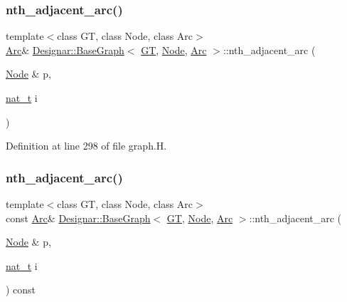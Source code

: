 \subsubsection{\texorpdfstring{nth\+\_\+adjacent\+\_\+arc()}{nth\_adjacent\_arc()}\hspace{0.1cm}{\footnotesize\ttfamily [1/2]}}
{\footnotesize\ttfamily template$<$class GT, class Node, class Arc$>$ \\
\hyperlink{namespace_designar_a3f55fb5513d62ff47cbc8f72b8e95d6f}{Arc}\& \hyperlink{class_designar_1_1_base_graph}{Designar\+::\+Base\+Graph}$<$ \hyperlink{demo-buildgraph_8_c_a3001c40d2c31ca87ed96cd7d1334a55e}{GT}, \hyperlink{namespace_designar_a5af326c65aa2bd26b26c410f2030d09e}{Node}, \hyperlink{namespace_designar_a3f55fb5513d62ff47cbc8f72b8e95d6f}{Arc} $>$\+::nth\+\_\+adjacent\+\_\+arc (\begin{DoxyParamCaption}\item[{\hyperlink{namespace_designar_a5af326c65aa2bd26b26c410f2030d09e}{Node} \&}]{p,  }\item[{\hyperlink{namespace_designar_aa72662848b9f4815e7bf31a7cf3e33d1}{nat\+\_\+t}}]{i }\end{DoxyParamCaption})\hspace{0.3cm}{\ttfamily [inline]}}



Definition at line 298 of file graph.\+H.

\mbox{\label{class_designar_1_1_base_graph_a3ca561f708fec1724d5c95192f98ef96}} 
\subsubsection{\texorpdfstring{nth\+\_\+adjacent\+\_\+arc()}{nth\_adjacent\_arc()}\hspace{0.1cm}{\footnotesize\ttfamily [2/2]}}
{\footnotesize\ttfamily template$<$class GT, class Node, class Arc$>$ \\
const \hyperlink{namespace_designar_a3f55fb5513d62ff47cbc8f72b8e95d6f}{Arc}\& \hyperlink{class_designar_1_1_base_graph}{Designar\+::\+Base\+Graph}$<$ \hyperlink{demo-buildgraph_8_c_a3001c40d2c31ca87ed96cd7d1334a55e}{GT}, \hyperlink{namespace_designar_a5af326c65aa2bd26b26c410f2030d09e}{Node}, \hyperlink{namespace_designar_a3f55fb5513d62ff47cbc8f72b8e95d6f}{Arc} $>$\+::nth\+\_\+adjacent\+\_\+arc (\begin{DoxyParamCaption}\item[{\hyperlink{namespace_designar_a5af326c65aa2bd26b26c410f2030d09e}{Node} \&}]{p,  }\item[{\hyperlink{namespace_designar_aa72662848b9f4815e7bf31a7cf3e33d1}{nat\+\_\+t}}]{i }\end{DoxyParamCaption}) const\hspace{0.3cm}{\ttfamily [inline]}}



